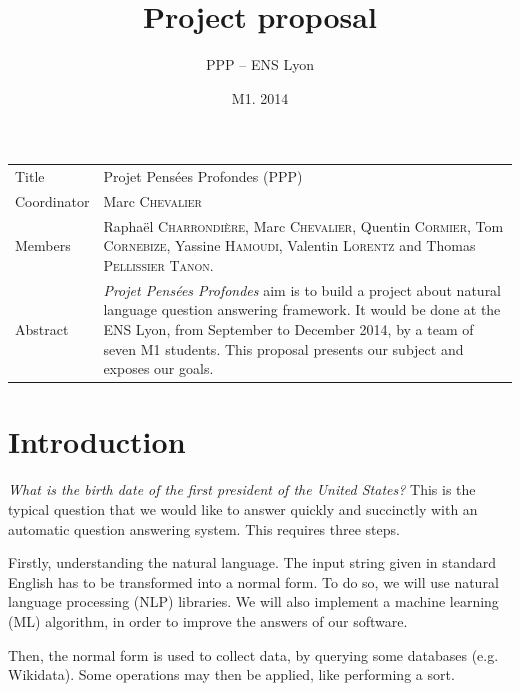 \documentclass[a4paper,10pt]{article}
\title{Project proposal}
\author{PPP \--- ENS Lyon}
\date{M1. 2014}
\begin{document}
\maketitle

\newlength{\title}
\settowidth{\title}{Coordinator }

\newlength{\object}
\setlength{\object}{\textwidth} \addtolength{\object}{-\title} \addtolength{\object}{-6.8pt} 
	\addtolength{\object}{-2\tabcolsep}

\renewcommand{\arraystretch}{1.5}

\begin{center}
\begin{tabular}{@{}|p{\title}p{\object}@{}|}
\hline
Title & Projet Pensées Profondes (PPP)\\
Coordinator & Marc \textsc{Chevalier}\\
Members & Raphaël \textsc{Charrondière}, Marc \textsc{Chevalier}, Quentin 
      \textsc{Cormier}, Tom \textsc{Cornebize}, \linebreak Yassine \textsc{Hamoudi}, 
      Valentin \textsc{Lorentz} and Thomas \textsc{Pellissier} \textsc{Tanon}.\\
Abstract & \emph{Projet Pensées Profondes} aim is to build a project about natural language question answering framework.
It would be done at the ENS Lyon, from September to December 2014, by a team of seven M1 students. This proposal presents
our subject and exposes our goals.\\
\hline
\end{tabular}
\end{center}

\section{Introduction}

\emph{What is the birth date of the first president of the United States?} This is the typical question that we would like to
answer quickly and succinctly with an automatic question answering system. This requires three steps.

Firstly, understanding the natural language. The input string given in standard 
English has to be transformed into a normal form. To do so, we will use natural 
language processing (NLP) libraries. We will also implement a machine learning 
(ML) algorithm, in order to improve the answers of our software.

Then, the normal form is used to collect data, by querying some databases (e.g. 
Wikidata). Some operations may then be applied, like performing a sort.
\end{document}

